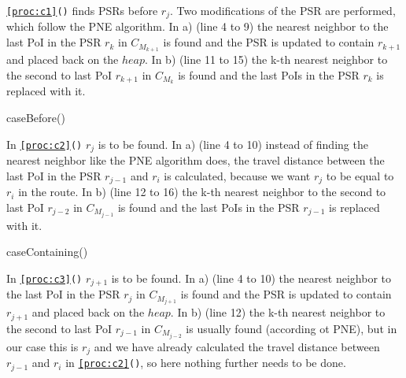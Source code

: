 \texttt{\ref{proc:c1}()} finds PSRs before $r_j$. Two modifications of the PSR are performed, which follow the PNE algorithm. In a) (line 4 to 9) the nearest neighbor to the last PoI in the PSR $r_k$ in $C_{M_{k+1}}$ is found and the PSR is updated to contain $r_{k+1}$ and placed back on the $heap$. In b) (line 11 to 15) the k-th nearest neighbor to the second to last PoI $r_{k+1}$ in $C_{M_{k}}$ is found and the last PoIs in the PSR $r_k$ is replaced with it. \newline

\raggedbottom

\begin{procedure}[H]
\caption{caseBefore()}
\label{proc:c1}
	
\end{procedure}

In \texttt{\ref{proc:c2}()} $r_j$ is to be found. In a) (line 4 to 10) instead of finding the nearest neighbor like the PNE algorithm does, the travel distance between the last PoI in the PSR $r_{j-1}$ and $r_i$ is calculated, because we want $r_j$ to be equal to $r_i$ in the route. In b) (line 12 to 16) the k-th nearest neighbor to the second to last PoI $r_{j-2}$ in $C_{M_{j-1}}$ is found and the last PoIs in the PSR $r_{j-1}$ is replaced with it.

\begin{procedure}[H]
\caption{caseContaining()}
\label{proc:c2}
	
\end{procedure}

\flushbottom

In \texttt{\ref{proc:c3}()} $r_{j+1}$ is to be found. In a) (line 4 to 10) the nearest neighbor to the last PoI in the PSR $r_j$ in $C_{M_{j+1}}$ is found and the PSR is updated to contain $r_{j+1}$ and placed back on the $heap$. In b) (line 12) the k-th nearest neighbor to the second to last PoI $r_{j-1}$ in $C_{M_{j-2}}$ is usually found (according ot PNE), but in our case this is $r_j$ and we have already calculated the travel distance between $r_{j-1}$ and $r_i$ in \texttt{\ref{proc:c2}()}, so here nothing further needs to be done.

